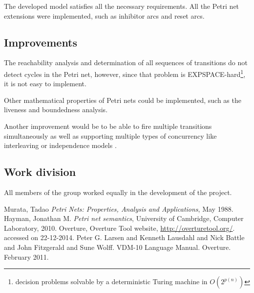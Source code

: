 \documentclass[a4paper]{article}
\begin{document}
The developed model satisfies all the necessary requirements. All the Petri net extensions were implemented, such as inhibitor arcs and reset arcs.

\subsection{Improvements}
The reachability analysis and determination of all sequences of transitions do not detect cycles in the Petri net, however, since that problem is EXPSPACE-hard\footnote{decision problems solvable by a deterministic Turing machine in $O(2^{p(n)})$}, it is not easy to implement.

Other mathematical properties of Petri nets could be implemented, such as the liveness and boundedness analysis.

Another improvement would be to be able to fire multiple transitions simultaneously as well as supporting multiple types of concurrency like interleaving or independence models \cite{Hayman}.

\subsection{Work division}
All members of the group worked equally in the development of the project.


\clearpage
{}
\renewcommand\refname{References}

\begin{thebibliography}{9}



 Murata, Tadao \emph{Petri Nets: Properties, Analysis and Applications}, May 1988.
 Hayman, Jonathan M. \emph{Petri net semantics}, University of Cambridge, Computer Laboratory, 2010.
 Overture, Overture Tool website, {\url{http://overturetool.org/}}. accessed on 22-12-2014.
 Peter G. Larsen and Kenneth Lausdahl and Nick Battle and John Fitzgerald and Sune Wolff. VDM-10 Language Manual. Overture. February 2011.

\end{thebibliography}
\end{document}
